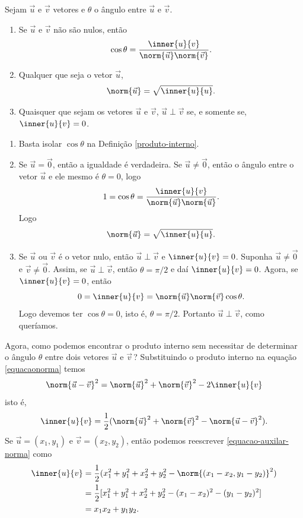\begin{proposicao}
  Sejam $\vec{u}$ e $\vec{v}$ vetores e $\theta$ o ângulo entre $\vec{u}$ e $\vec{v}$.
  \begin{enumerate}
    \item Se $\vec{u}$ e $\vec{v}$ não são nulos, então
    \[
      \cos\theta = \dfrac{\inner{u}{v}}{\norm{\vec{u}}\norm{\vec{v}}}.
    \]
    \item Qualquer que seja o vetor $\vec{u}$,
    \[
      \norm{\vec{u}} = \sqrt{\inner{u}{u}}.
    \]
    \item Quaisquer que sejam os vetores $\vec{u}$ e $\vec{v}$, $\vec{u}\perp\vec{v}$ se, e somente se, $\inner{u}{v} = 0$.
    \end{enumerate}
\end{proposicao}
\begin{prova}
  \begin{enumerate}
    \item Basta isolar $\cos\theta$ na Definição \ref{produto-interno}.
    \item Se $\vec{u} = \vec{0}$, então a igualdade é verdadeira. Se $\vec{u} \ne \vec{0}$, então o ângulo entre o vetor $\vec{u}$ e ele mesmo é $\theta = 0$, logo
    \[
      1 = \cos\theta = \dfrac{\inner{u}{v}}{\norm{\vec{u}}\norm{\vec{u}}}.
    \]
    Logo
    \[
      \norm{\vec{u}} = \sqrt{\inner{u}{u}}.
    \]
    \item Se $\vec{u}$ ou $\vec{v}$ é o vetor nulo, então $\vec{u}\perp\vec{v}$ e $\inner{u}{v} = 0$. Suponha $\vec{u} \ne \vec{0}$ e $\vec{v} \ne \vec{0}$. Assim, se $\vec{u} \perp\vec{v}$, então $\theta = \pi/2$ e daí $\inner{u}{v} = 0$. Agora, se $\inner{u}{v} = 0$, então
    \[
      0 = \inner{u}{v} = \norm{\vec{u}}\norm{\vec{v}}\cos\theta.
    \]
    Logo devemos ter $\cos\theta = 0$, isto é, $\theta = \pi/2$. Portanto $\vec{u}\perp\vec{v}$, como queríamos.
  \end{enumerate}
\end{prova}

Agora, como podemos encontrar o produto interno sem necessitar de determinar o ângulo $\theta$ entre dois vetores $\vec{u}$ e $\vec{v}$\,? Substituindo o produto interno na equação \eqref{equacaonorma} temos
\[
  \norm{\vec{u} - \vec{v}}^2 = \norm{\vec{u}}^2 + \norm{\vec{v}}^2 - 2\inner{u}{v}
\]
isto é,
\begin{align}\label{equacao-auxilar-norma}
  \inner{u}{v} = \dfrac{1}{2}(\norm{\vec{u}}^2 + \norm{\vec{v}}^2 - \norm{\vec{u} - \vec{v}}^2).
\end{align}
Se $\vec{u} = (x_1, y_1)$ e $\vec{v} = (x_2, y_2)$, então podemos reescrever \eqref{equacao-auxilar-norma} como
\begin{align*}
  \inner{u}{v} &= \dfrac{1}{2}(x_1^2 + y_1^2 + x_2^2 + y_2^2 - \norm{(x_1 - x_2, y_1 - y_2)}^2)\\
  &= \dfrac{1}{2}[x_1^2 + y_1^2 + x_2^2 + y_2^2 - (x_1 - x_2)^2 - (y_1 - y_2)^2]\\
  &= x_1x_2 + y_1y_2.
\end{align*}

